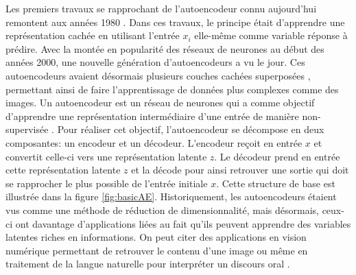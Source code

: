 Les premiers travaux se rapprochant de l'autoencodeur connu aujourd'hui remontent aux années 1980 \citep{Rumelhart-1986}. Dans ces travaux, le principe était d'apprendre une représentation cachée en utilisant l'entrée $x_i$ elle-même comme variable réponse à prédire. Avec la montée en popularité des réseaux de neurones au début des années 2000, une nouvelle génération d'autoencodeurs a vu le jour. Ces autoencodeurs avaient désormais plusieurs couches cachées superposées \citep{HintonSalakhutdinov2006b}, permettant ainsi de faire l'apprentissage de données plus complexes comme des images. Un autoencodeur est un réseau de neurones qui a comme objectif d'apprendre une représentation intermédiaire d'une entrée de manière non-supervisée \citep{Goodfellow-et-al-2016}. Pour réaliser cet objectif, l'autoencodeur se décompose en deux composantes: un encodeur et un décodeur. L'encodeur reçoit en entrée $x$ et convertit celle-ci vers une représentation latente $z$. Le décodeur prend en entrée cette représentation latente $z$ et la décode pour ainsi retrouver une sortie qui doit se rapprocher le plus possible de l'entrée initiale $x$. Cette structure de base est illustrée dans la figure \ref{fig:basicAE}. Historiquement, les autoencodeurs étaient vus comme une méthode de réduction de dimensionnalité, mais désormais, ceux-ci ont davantage d'applications liées au fait qu'ils peuvent apprendre des variables latentes riches en informations. On peut citer des applications en vision numérique permettant de retrouver le contenu d'une image \citep{conf/esann/KrizhevskyH11} ou même en traitement de la langue naturelle pour interpréter un discours oral \citep{inproceedings}. \newline

